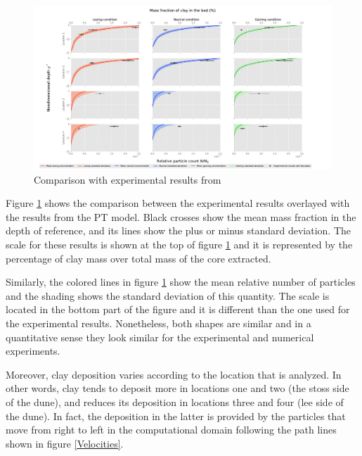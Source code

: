 \documentclass[draft,linenumbers]{agujournal2018}
\begin{document}
\begin{figure}[ht]
\centering
\includegraphics[trim=0.2cm 0.2cm 0.2cm 0.2cm, width=40pc]
{181203_Comparing.pdf}
\caption{Comparison with experimental results from \citep{Fox2018}}
\label{Comparison}
\end{figure}

Figure \ref{Comparison} shows the comparison between the experimental results overlayed with the results from the PT model. Black crosses show the mean mass fraction in the depth of reference, and its lines show the plus or minus standard deviation. The scale for these results is shown at the top of figure \ref{Comparison} and it is represented by the percentage of clay mass over total mass of the core extracted. 

Similarly, the colored lines in figure \ref{Comparison} show the mean relative number of particles and the shading shows the standard deviation of this quantity. The scale is located in the bottom part of the figure and it is different than the one used for the experimental results. Nonetheless, both shapes are similar and in a quantitative sense they look similar for the experimental and numerical experiments.

Moreover, clay deposition varies according to the location that is analyzed. In other words, clay tends to deposit more in locations one and two (the stoss side of the dune), and reduces its deposition in locations three and four (lee side of the dune). In fact, the deposition in the latter is provided by the particles that move from right to left in the computational domain following the path lines shown in figure \ref{Velocities}.
\end{document}
